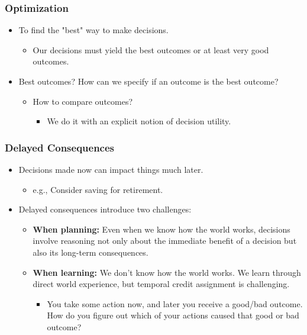 \subsubsection{Optimization}
\begin{summary}
    \begin{itemize}
        \item To find the "best" way to make decisions.
        \begin{itemize}
            \item Our decisions must yield the best outcomes or at least very good outcomes.
        \end{itemize}
        \item Best outcomes? How can we specify if an outcome is the best outcome?
        \begin{itemize}
            \item How to compare outcomes?
            \begin{itemize}
                \item We do it with an explicit notion of decision utility.
            \end{itemize}
        \end{itemize}
    \end{itemize}
\end{summary}

\subsubsection{Delayed Consequences}
\begin{summary}
    \begin{itemize}
        \item Decisions made now can impact things much later.
        \begin{itemize}
            \item e.g., Consider saving for retirement.
        \end{itemize}
        \item Delayed consequences introduce two challenges:
        \begin{itemize}
            \item \textbf{When planning:} Even when we know how the world works, decisions involve reasoning not only about the immediate benefit of a decision but also its long-term consequences.
            \item \textbf{When learning:} We don't know how the world works. We learn through direct world experience, but temporal credit assignment is challenging.
            \begin{itemize}
                \item You take some action now, and later you receive a good/bad outcome. How do you figure out which of your actions caused that good or bad outcome?
            \end{itemize}
        \end{itemize}
    \end{itemize}
\end{summary}

